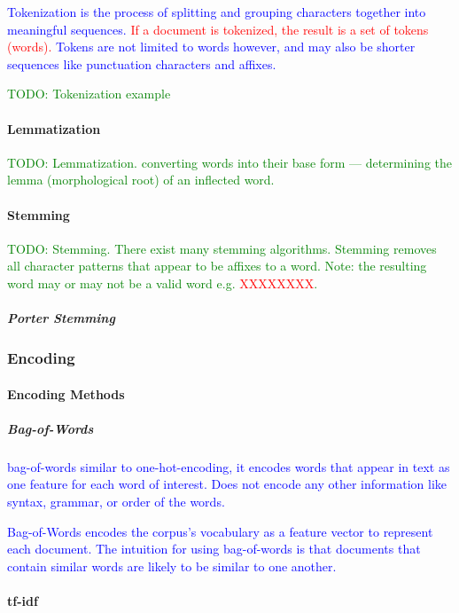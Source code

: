 \textcolor{blue}{Tokenization is the process of splitting and grouping characters together into meaningful sequences. \textcolor{red}{If a document is tokenized, the result is a set of tokens (words).} Tokens are not limited to words however, and may also be shorter sequences like punctuation characters and affixes.}

\textcolor{green}{TODO: Tokenization example}

\paragraph{Lemmatization}

\textcolor{green}{TODO: Lemmatization. converting words into their base form --- determining the lemma (morphological root) of an inflected word.}

\paragraph{Stemming}

\textcolor{green}{TODO: Stemming. There exist many stemming algorithms. Stemming removes all character patterns that appear to be affixes to a word. Note: the resulting word may or may not be a valid word e.g. \textcolor{red}{XXXXXXXX}.}

\subparagraph{Porter Stemming}

\subsubsection{Encoding}

\paragraph{Encoding Methods}

\subparagraph{Bag-of-Words}

\textcolor{blue}{{bag-of-words} similar to one-hot-encoding, it encodes words that appear in text as one feature for each word of interest. Does not encode any other information like syntax, grammar, or order of the words.}

\textcolor{blue}{Bag-of-Words encodes the corpus's vocabulary as a feature vector to represent each document. The intuition for using bag-of-words is that documents that contain similar words are likely to be similar to one another.}


\paragraph{tf-idf}

